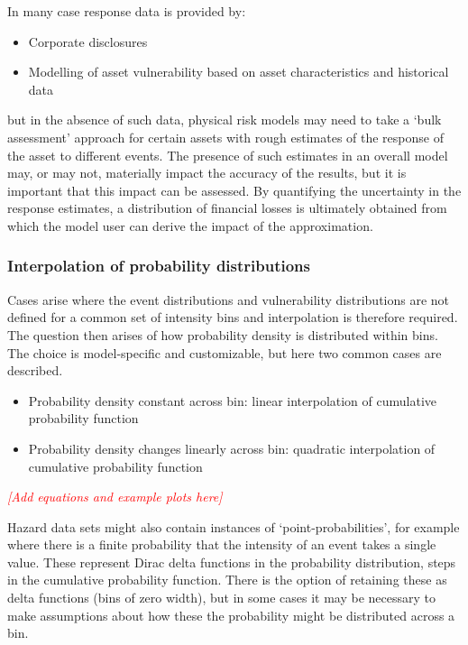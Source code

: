 \documentclass[a4paper,11pt]{extarticle} %
\begin{document}
In many case response data is provided by:
\begin{itemize}
	\item Corporate disclosures
	\item Modelling of asset vulnerability based on asset characteristics and historical data
\end{itemize}
but in the absence of such data, physical risk models may need to take a `bulk assessment' approach for certain assets with rough estimates of the response of the asset to different events. The presence of such estimates in an overall model may, or may not, materially impact the accuracy of the results, but it is important that this impact can be assessed. By quantifying the uncertainty in the response estimates, a distribution of financial losses is ultimately obtained from which the model user can derive the impact of the approximation.   

\subsubsection{Interpolation of probability distributions}
Cases arise where the event distributions and vulnerability distributions are not defined for a common set of intensity bins and interpolation is therefore required. The question then arises of how probability density is distributed within bins. The choice is model-specific and customizable, but here two common cases are described.

\begin{itemize}
	\item Probability density constant across bin: linear interpolation of cumulative probability function
	\item Probability density changes linearly across bin: quadratic interpolation of cumulative probability function
\end{itemize}

{\textcolor{red}{\emph{[Add equations and example plots here]}}}  

Hazard data sets might also contain instances of `point-probabilities', for example where there is a finite probability that the intensity of an event takes a single value. These represent Dirac delta functions in the probability distribution, steps in the cumulative probability function. There is the option of retaining these as delta functions (bins of zero width), but in some cases it may be necessary to make assumptions about how these the probability might be distributed across a bin. 
\end{document}
